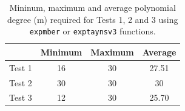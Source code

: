 \begin{table}[!t]\begin{center}
        \caption{Mininum, maximum and average polynomial degree (m) required for Tests 1, 2 and 3 using \texttt{expmber} or \texttt{exptaynsv3} functions.}
{\small
        \begin{tabular}{|c||c|c|c|}\hline & Minimum & Maximum & Average \\\hline
            Test 1 & 16 & 30 & 27.51 \\\hline
            Test 2 & 30 & 30 & 30 \\\hline
            Test 3 & 12 & 30 & 25.70 \\\hline
        \end{tabular}}
        \label{table_m_comparative}
    \end{center}
\end{table} 


